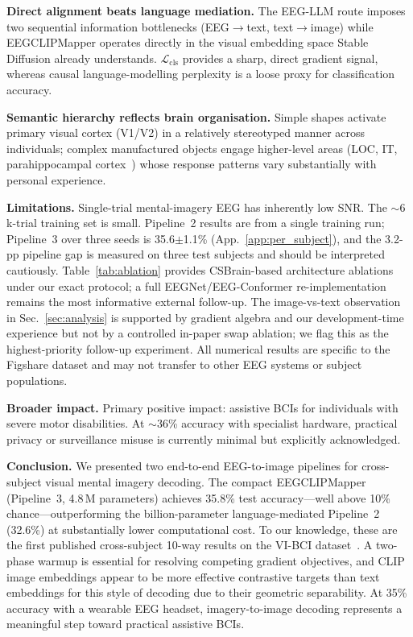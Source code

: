\documentclass{article}
\begin{document}
\textbf{Direct alignment beats language mediation.} The EEG-LLM route imposes two sequential information bottlenecks (EEG$\to$text, text$\to$image) while EEGCLIPMapper operates directly in the visual embedding space Stable Diffusion already understands. $\mathcal{L}_\mathrm{cls}$ provides a sharp, direct gradient signal, whereas causal language-modelling perplexity is a loose proxy for classification accuracy.

\textbf{Semantic hierarchy reflects brain organisation.} Simple shapes activate primary visual cortex (V1/V2) in a relatively stereotyped manner across individuals; complex manufactured objects engage higher-level areas (LOC, IT, parahippocampal cortex~\citep{haxby2001distributed,dijkstra2019differential}) whose response patterns vary substantially with personal experience.

\textbf{Limitations.} Single-trial mental-imagery EEG has inherently low SNR. The $\sim$6\,k-trial training set is small. Pipeline~2 results are from a single training run; Pipeline~3 over three seeds is 35.6$\pm$1.1\% (App.~\ref{app:per_subject}), and the 3.2-pp pipeline gap is measured on three test subjects and should be interpreted cautiously. Table~\ref{tab:ablation} provides CSBrain-based architecture ablations under our exact protocol; a full EEGNet/EEG-Conformer re-implementation remains the most informative external follow-up. The image-vs-text observation in Sec.~\ref{sec:analysis} is supported by gradient algebra and our development-time experience but not by a controlled in-paper swap ablation; we flag this as the highest-priority follow-up experiment. All numerical results are specific to the Figshare dataset and may not transfer to other EEG systems or subject populations.

\textbf{Broader impact.} Primary positive impact: assistive BCIs for individuals with severe motor disabilities. At $\sim$36\% accuracy with specialist hardware, practical privacy or surveillance misuse is currently minimal but explicitly acknowledged.

\textbf{Conclusion.} We presented two end-to-end EEG-to-image pipelines for cross-subject visual mental imagery decoding. The compact EEGCLIPMapper (Pipeline~3, 4.8\,M parameters) achieves 35.8\% test accuracy---well above 10\% chance---outperforming the billion-parameter language-mediated Pipeline~2 (32.6\%) at substantially lower computational cost. To our knowledge, these are the first published cross-subject 10-way results on the VI-BCI dataset~\citep{figshare_eeg,figshare_paper}. A two-phase warmup is essential for resolving competing gradient objectives, and CLIP image embeddings appear to be more effective contrastive targets than text embeddings for this style of decoding due to their geometric separability. At 35\% accuracy with a wearable EEG headset, imagery-to-image decoding represents a meaningful step toward practical assistive BCIs.
\end{document}
